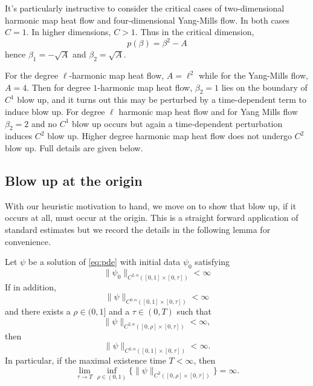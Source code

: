 \documentclass{amsart}
\begin{document}
It's particularly instructive to consider the critical cases of two-dimensional harmonic map heat flow and four-dimensional Yang-Mills flow. In both cases \(C = 1\). In higher dimensions, \(C > 1\). Thus in the critical dimension,
\[
p(\beta) = \beta^2 - A
\]
hence \(\beta_1 = - \sqrt{A}\) and \(\beta_2 = \sqrt{A}\).

For the degree \(\ell\)-harmonic map heat flow, \(A = \ell^2\) while for the Yang-Mills flow, \(A = 4\). Then for degree \(1\)-harmonic map heat flow, \(\beta_2 = 1\) lies on the boundary of \(C^1\) blow up, and it turns out this may be perturbed by a time-dependent term to induce blow up. For degree \(\ell\) harmonic map heat flow and for Yang Mills flow \(\beta_2 = 2\) and no \(C^1\) blow up occurs but again a time-dependent perturbation induces \(C^2\) blow up. Higher degree harmonic map heat flow does not undergo \(C^2\) blow up. Full details are given below.

\subsection*{Blow up at the origin}

With our heuristic motivation to hand, we move on to show that blow up, if it occurs at all, must occur at the origin. This is a straight forward application of standard estimates \cite[Theorem 10.1]{Ladyzhenskaja:/1967} but we record the details in the following lemma for convenience.

\begin{lemma}
\label{lem:apriori_bounds}
Let \(\psi\) be a solution of \eqref{eq:pde} with initial data \(\psi_0\) satisfying
\[
\|\psi_0\|_{C^{2,\alpha}([0, 1] \times [0, \tau])} < \infty
\]
If in addition,
\[
\|\psi\|_{C^{0,\alpha}([0, 1] \times [0, \tau])} < \infty
\]
and there exists a \(\rho \in (0, 1]\) and a \(\tau \in (0, T)\) such that
\[
\|\psi\|_{C^{2,\alpha}([0, \rho] \times [0, \tau])} < \infty,
\]
then
\[
\|\psi\|_{C^{2,\alpha}([0, 1] \times [0, \tau])} < \infty.
\]
In particular, if the maximal existence time \(T < \infty\), then
\[
\lim_{\tau\to T} \inf_{\rho \in (0, 1)} \{\|\psi\|_{C^2([0, \rho] \times [0, \tau])}\} = \infty.
\]
\end{lemma}
\end{document}
